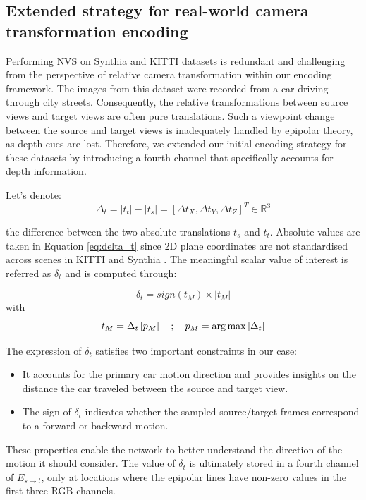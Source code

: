\subsection{Extended strategy for real-world camera transformation encoding}

Performing \ac{NVS} on Synthia \citep{ros2016synthia} and KITTI \citep{geiger2012we} datasets is redundant and challenging from the perspective of relative camera transformation within our encoding framework. The images from this dataset were recorded from a car driving through city streets. Consequently, the relative transformations between source views and target views are often pure translations. Such a viewpoint change between the source and target views is inadequately handled by epipolar theory, as depth cues are lost. Therefore, we extended our initial encoding strategy for these datasets by introducing a fourth channel that specifically accounts for depth information.

Let's denote:
\begin{equation}
    \Delta_{t}= |t_{t}| - |t_{s}| = \left[\Delta t_{X},\Delta t_{Y},\Delta t_{Z} \right]^{T} \in \mathbb{R}^3
    \label{eq:delta_t}
\end{equation}

\noindent the difference between the two absolute translations $t_s$ and $t_t$. Absolute values are taken in Equation \eqref{eq:delta_t} since 2D plane coordinates are not standardised across scenes in KITTI \citep{geiger2012we} and Synthia \citep{ros2016synthia}. The meaningful scalar value of interest is referred as $\delta_{t}$ and is computed through:
 
 \begin{equation}
 \label{eq:2}
     \delta_{t} = sign(t_{M}) \times| t_{M} |
 \end{equation}
 with 
 \begin{equation}
    t_{M} = \Delta_{t}\left[p_{M}\right] \quad ; \quad p_{M}= \argmax|\Delta_{t}|
\end{equation}

The expression of $\delta_{t}$ satisfies two important constraints in our case: 

\begin{itemize}
    \item It accounts for the primary car motion direction and provides insights on the distance the car traveled between the source and target view.
    \item The sign of $\delta_{t}$ indicates whether the sampled source/target frames correspond to a forward or backward motion.  
\end{itemize}
These properties enable the network to better understand the direction of the motion it should consider. The value of  $\delta_{t}$ is ultimately stored in a fourth channel of $E_{s\xrightarrow{}t}$, only at locations where the epipolar lines have non-zero values in the first three RGB channels. 


